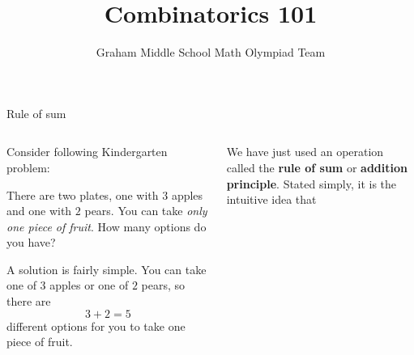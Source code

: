 \documentclass[9pt,aspectratio=169]{beamer}
\title{Combinatorics 101}
\subtitle[Graham Middle School]{Graham Middle School Math Olympiad Team}
\begin{document}
\maketitle

\begin{frame}{Rule of sum}
  \begin{columns}[T]
    \begin{column}{0.5\textwidth}
      Consider following Kindergarten problem:

      \begin{problem}{}
        There are two plates, one with $3$ apples and one with $2$ pears. You can take \emph{only one piece of fruit}. How many options do you have?
      \end{problem}
  
      \begin{nscenter}
      \end{nscenter}

      A solution is fairly simple. You can take one of $3$ apples or one of $2$ pears, so there are
      \[ 3 + 2 = 5 \]
      different options for you to take one piece of fruit.
    \end{column}
    \begin{column}{0.5\textwidth}
      We have just used an operation called the \textbf{rule of sum} or \textbf{addition principle}. Stated simply, it is the intuitive idea that 


\end{column}
\end{columns}
\end{frame}
\end{document}
